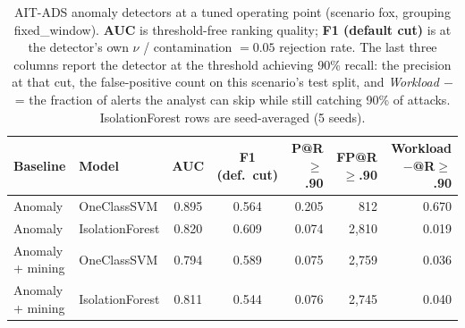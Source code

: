 \begin{table}[htbp]
\centering
\small
\caption{AIT-ADS anomaly detectors at a tuned operating point (scenario fox, grouping fixed_window). \textbf{AUC} is
threshold-free ranking quality; \textbf{F1 (default cut)} is at the detector's own
$\nu$ / contamination $= 0.05$ rejection rate. The last three columns report the
detector at the threshold achieving 90\% recall: the precision at that cut, the
false-positive count on this scenario's test split, and \emph{Workload $-$} = the
fraction of alerts the analyst can skip while still catching 90\% of attacks.
IsolationForest rows are seed-averaged (5 seeds).}
\label{tab:ait-ads-fox-fixed_window-anomaly-operating-points}
\begin{tabular}{llccrrr}
\toprule
\textbf{Baseline} & \textbf{Model} & \textbf{AUC} & \textbf{F1 (def.\ cut)} & \textbf{P@R$\geq$.90} & \textbf{FP@R$\geq$.90} & \textbf{Workload$-$@R$\geq$.90} \\
\midrule
Anomaly & OneClassSVM & 0.895 & 0.564 & 0.205 & 812 & 0.670 \\
Anomaly & IsolationForest & 0.820 & 0.609 & 0.074 & 2,810 & 0.019 \\
Anomaly + mining & OneClassSVM & 0.794 & 0.589 & 0.075 & 2,759 & 0.036 \\
Anomaly + mining & IsolationForest & 0.811 & 0.544 & 0.076 & 2,745 & 0.040 \\
\bottomrule
\end{tabular}
\end{table}

